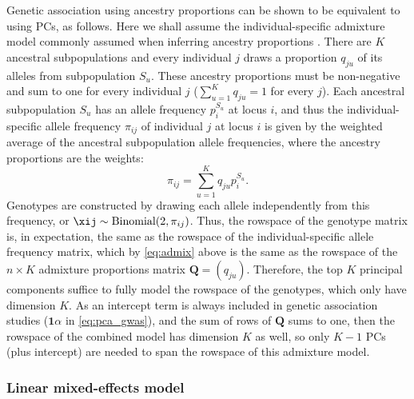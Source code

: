 \documentclass[11pt]{article}
\begin{document}
Genetic association using ancestry proportions can be shown to be equivalent to using PCs, as follows.
Here we shall assume the individual-specific admixture model commonly assumed when inferring ancestry proportions \citep{pritchard_inference_2000, falush_inference_2003, alexander_fast_2009, gopalan_scaling_2016, cabreros_likelihood-free_2019}.
There are $K$ ancestral subpopulations and every individual $j$ draws a proportion $q_{ju}$ of its alleles from subpopulation $S_u$.
These ancestry proportions must be non-negative and sum to one for every individual $j$ ($\sum_{u=1}^K q_{ju} = 1$ for every $j$).
Each ancestral subpopulation $S_u$ has an allele frequency $p_i^{S_u}$ at locus $i$, and thus the individual-specific allele frequency $\pi_{ij}$ of individual $j$ at locus $i$ is given by the weighted average of the ancestral subpopulation allele frequencies, where the ancestry proportions are the weights:
\begin{equation}
  \label{eq:admix}
  \pi_{ij} = \sum_{u=1}^K q_{ju} p_i^{S_u}.
\end{equation}
Genotypes are constructed by drawing each allele independently from this frequency, or $\xij \sim \text{Binomial}(2, \pi_{ij})$.
Thus, the rowspace of the genotype matrix is, in expectation, the same as the rowspace of the individual-specific allele frequency matrix, which by \cref{eq:admix} above is the same as the rowspace of the $n \times K$ admixture proportions matrix $\mathbf{Q} = (q_{ju})$.
Therefore, the top $K$ principal components suffice to fully model the rowspace of the genotypes, which only have dimension $K$.
As an intercept term is always included in genetic association studies ($\mathbf{1} \alpha$ in \cref{eq:pca_gwas}), and the sum of rows of $\mathbf{Q}$ sums to one, then the rowspace of the combined model has dimension $K$ as well, so only $K-1$ PCs (plus intercept) are needed to span the rowspace of this admixture model.

\subsubsection{Linear mixed-effects model}
\end{document}

